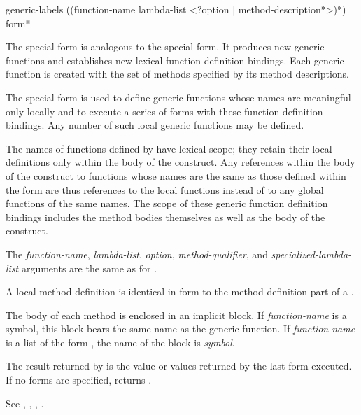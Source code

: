 \begin{defspec}
generic-labels ({(function-name lambda-list
                <?option | {method-description}*>)}*)
               {\,form}*


The  special form is analogous to the
 special form.  It produces new generic functions and
establishes new lexical function definition bindings.  Each generic
function is created with the set of methods specified by its method
descriptions.



The special form  is used to define generic functions
whose names are meaningful only locally and to execute a series of
forms with these function definition bindings.  Any number of
such  local generic functions may be defined.  



The names of functions defined by  have lexical
scope; they retain their local definitions only within the body of the
 construct.  Any references within the body of the
 construct to functions whose names are the same
as those defined within the  form are thus
references to the local functions instead of to any global functions
of the same names.  The scope of these generic function definition bindings
includes the method bodies themselves as well as the body of the 
 construct.




The \emph{function-name\/}, \emph{lambda-list\/}, \emph{option}, {\it
method-qualifier}, and \emph{specialized-lambda-list\/} arguments are
the same as for .

A  local method definition is identical in form to the
method definition part of a .

The body of each method is enclosed in an implicit block.  If {\it
function-name\/} is a symbol, this block bears the same name as
the generic function.  If \emph{function-name\/} is a list of the
form , the name of the block is {\it
symbol}.  


The result returned by  is the value or values
returned by the last form executed.  If no forms are specified, 
 returns .

See , , , .
\end{defspec}


